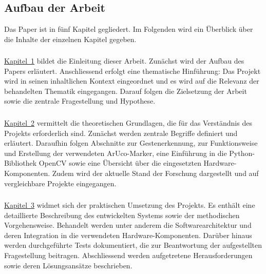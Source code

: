 \chapter{\chapOne}
\label{sec:kapitel1} %

\begingroup
\fontsize{12pt}{14pt}\selectfont

\section{Aufbau der Arbeit}
Das Paper \textit{\maTitle} ist in fünf Kapitel gegliedert.
Im Folgenden wird ein Überblick über die Inhalte der einzelnen Kapitel gegeben.

\subsection{\chapOne}
\hyperref[sec:kapitel1]{Kapitel~1} bildet die Einleitung dieser Arbeit.
Zunächst wird der Aufbau des Papers erläutert.
Anschliessend erfolgt eine thematische Hinführung: Das Projekt wird in seinen inhaltlichen Kontext eingeordnet und es wird auf die Relevanz der behandelten Thematik eingegangen.
Darauf folgen die Zielsetzung der Arbeit sowie die zentrale Fragestellung und Hypothese.

\subsection{\chapTwo}
\hyperref[sec:kapitel2]{Kapitel~2} vermittelt die theoretischen Grundlagen, die für das Verständnis des Projekts erforderlich sind.
Zunächst werden zentrale Begriffe definiert und erläutert.
Daraufhin folgen Abschnitte zur Gestenerkennung, zur Funktionsweise und Erstellung der verwendeten ArUco-Marker, eine Einführung in die Python-Bibliothek OpenCV sowie eine Übersicht über die eingesetzten Hardware-Komponenten.
Zudem wird der aktuelle Stand der Forschung dargestellt und auf vergleichbare Projekte eingegangen.

\subsection{\chapThree}
\hyperref[sec:kapitel3]{Kapitel~3} widmet sich der praktischen Umsetzung des Projekts.
Es enthält eine detaillierte Beschreibung des entwickelten Systems sowie der methodischen Vorgehensweise.
Behandelt werden unter anderem die Softwarearchitektur und deren Integration in die verwendeten Hardware-Komponenten.
Darüber hinaus werden durchgeführte Tests dokumentiert, die zur Beantwortung der aufgestellten Fragestellung beitragen.
Abschliessend werden aufgetretene Herausforderungen sowie deren Lösungsansätze beschrieben.

